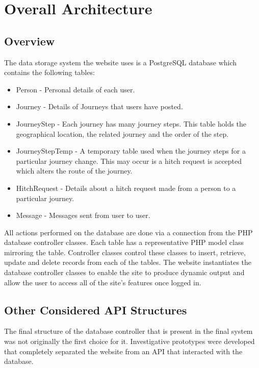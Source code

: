 \section{Overall Architecture}
	\subsection{Overview}	
		The data storage system the website uses is a PostgreSQL database which contains the following tables:
		\begin{itemize}
		\item Person - Personal details of each user.
		\item Journey - Details of Journeys that users have posted.
		\item Journey\textunderscore Step - Each journey has many journey steps. This table holds the geographical location, the related journey and the order of the step.
		\item Journey\textunderscore Step\textunderscore Temp - A temporary table used when the journey steps for a particular journey change. This may occur is a hitch request is accepted which alters the route of the journey.
		\item Hitch\textunderscore Request - Details about a hitch request made from a person to a particular journey.
		\item Message - Messages sent from user to user.
		\end{itemize}
		
		All actions performed on the database are done via a connection from the PHP database controller classes. Each table has a representative PHP model class mirroring the table. Controller classes control these classes to insert, retrieve, update and delete records from each of the tables. The website instantiates the database controller classes to enable the site to produce dynamic output and allow the user to access all of the site's features once logged in.
		
	\subsection{Other Considered API Structures}
		The final structure of the database controller that is present in the final system was not originally the first choice for it. Investigative prototypes were developed that completely separated the website from an API that interacted with the database. 
		
